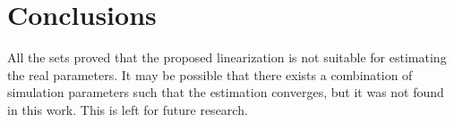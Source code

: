 \section{Conclusions}\label{sec:conc}
All the sets proved that the proposed linearization is not suitable for estimating the real parameters. It may be possible that there exists a combination of simulation parameters such that the estimation converges, but it was not found in this work. This is left for future research.
